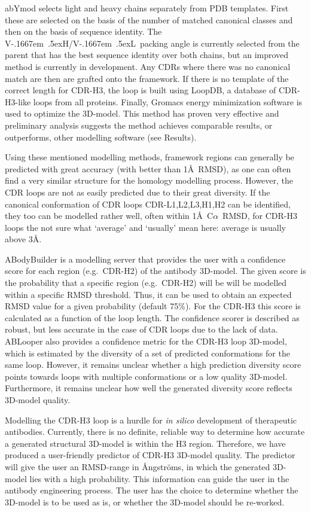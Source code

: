 \documentclass[12pt]{article}
\newcommand{\ca}{\mbox{C$\alpha$}}
\newcommand{\VH}{\mbox{V\kern-.1667em \lower.5ex\hbox{\scriptsize H}}}
\newcommand{\VL}{\mbox{V\kern-.1667em \lower.5ex\hbox{\scriptsize L}}}
\newcommand{\VHVL}{\mbox{\VH/\VL}}
\newcommand{\lilian}[1]{ {\color{red}{\bfseries Lilian:} #1}}
\begin{document}
abYmod selects light and heavy chains separately from PDB templates.
First these are selected on the basis of the number of matched
canonical classes and then on the basis of sequence identity.  The
\VHVL\ packing angle is currently selected from the parent that has
the best sequence identity over both chains, but an improved method is
currently in development. Any CDRs where there was no canonical match are then
are grafted onto the framework. If there is no template of the correct
length for CDR-H3, the loop is built using LoopDB, a database of
CDR-H3-like loops from all proteins. Finally, Gromacs energy
minimization software is used to optimize the 3D-model. This method has
proven very effective and preliminary analysis suggests the method
achieves comparable results, or outperforms, other modelling software
(see Results).

Using these mentioned modelling methods, framework regions can
generally be predicted with great accuracy (with better than 1\AA\
RMSD\cite{Almagro2014}), as one can often find a very similar
structure for the homology modelling process.  However, the CDR loops
are not as easily predicted due to their great diversity. If the
canonical conformation of CDR loops CDR-L1,L2,L3,H1,H2 can be identified, they too
can be modelled rather well, often within 1\AA\ \ca~RMSD, for CDR-H3 loops
the \lilian{not sure what `average' and `usually' mean here:} average is usually above 3\AA\cite{Almagro2011}.

ABodyBuilder is a modelling server that provides the user with a
confidence score for each region (e.g.\ CDR-H2) of the antibody
3D-model. The given score is the probability that a specific region
(e.g.\ CDR-H2) will be will be modelled within a specific RMSD
threshold\cite{Leem2016}. Thus, it can be used to obtain an expected
RMSD value for a given probability (default 75\%). For the CDR-H3 this
score is calculated as a function of the loop length.  The confidence
scorer is described as robust, but less accurate in the case of CDR
loops due to the lack of data\cite{Leem2016}. ABLooper also provides a
confidence metric for the CDR-H3 loop 3D-model, which is estimated by the
diversity of a set of predicted conformations for the same
loop\cite{Abanades2022}. However, it remains unclear whether a high
prediction diversity score points towards loops with multiple
conformations or a low quality 3D-model. Furthermore, it remains unclear
how well the generated diversity score reflects 3D-model
quality\cite{Abanades2022}.


Modelling the CDR-H3 loop is a hurdle for \emph{in silico} development of
therapeutic antibodies. Currently, there is no definite, reliable way
to determine how accurate a generated structural 3D-model is within the
H3 region. Therefore, we have produced a
user-friendly predictor of CDR-H3 3D-model quality. The predictor will give
the user an RMSD-range in {\AA}ngstr\"{o}ms, in which the generated 3D-model lies
with a high probability.
This information can guide the
user in the antibody engineering process. The user has the choice to
determine whether the 3D-model is to be used as is, or
whether the 3D-model should be re-worked.
\end{document}
